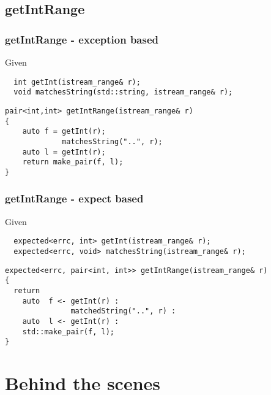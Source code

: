 \documentclass[xcolor=dvipsnames]{beamer}
\begin{document}
\subsection{getIntRange }

\begin{frame}[fragile]
\frametitle{getIntRange - exception based}

Given
\begin{lstlisting}
  int getInt(istream_range& r);
  void matchesString(std::string, istream_range& r);
\end{lstlisting}

\begin{lstlisting}
pair<int,int> getIntRange(istream_range& r) 
{
    auto f = getInt(r);
             matchesString("..", r);
    auto l = getInt(r);       
    return make_pair(f, l);
}
\end{lstlisting}

\end{frame}
\begin{frame}[fragile]
\frametitle{getIntRange - expect based}

Given
\begin{lstlisting}
  expected<errc, int> getInt(istream_range& r);
  expected<errc, void> matchesString(istream_range& r);
\end{lstlisting}

\begin{lstlisting}
expected<errc, pair<int, int>> getIntRange(istream_range& r) 
{
  return 
    auto  f <- getInt(r) : 
               matchedString("..", r) : 
    auto  l <- getInt(r) :
    std::make_pair(f, l);
}
\end{lstlisting}

\end{frame}
\section{Behind the scenes}
\end{document}
